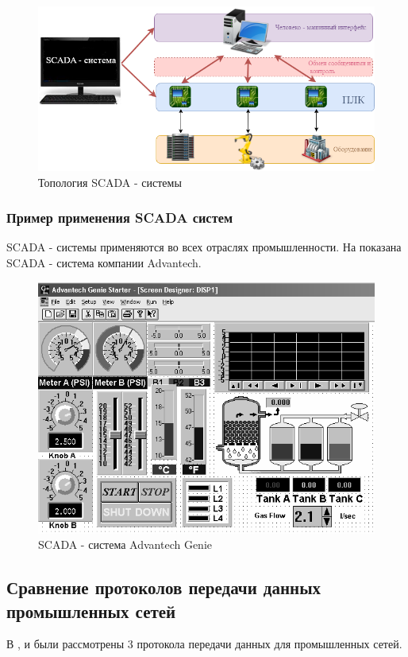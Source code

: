 \begin{figure}[p]
	\centering
	\includegraphics[width=\linewidth]{images/scadasys}
	\caption{Топология SCADA - системы}
	\label{fig:scadasys}
\end{figure}


\subsubsection{Пример применения SCADA систем}
SCADA - системы применяются во всех отраслях промышленности. На  показана SCADA - система компании Advantech.


\begin{figure}[p]
	\centering
	\includegraphics[width=\linewidth]{images/at-genie}
	\caption{SCADA - система Advantech Genie}
	\label{fig:at-genie}
\end{figure}

\subsection{Сравнение протоколов передачи данных промышленных сетей}
В ,  и  были рассмотрены 3 протокола передачи данных для промышленных сетей.

